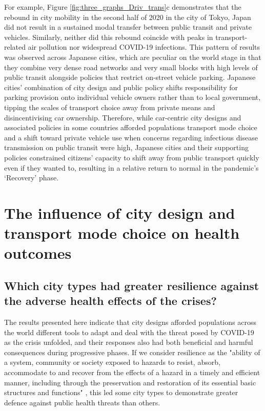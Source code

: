 \documentclass[preprint,10pt]{elsarticle} %
\begin{document}
For example, Figure \ref{fig:three_graphs_Driv_trans}c demonstrates that the rebound in city mobility in the second half of 2020 in the city of Tokyo, Japan did not result in a sustained modal transfer between public transit and private vehicles. Similarly, neither did this rebound coincide with peaks in transport-related air pollution nor widespread COVID-19 infections. This pattern of results was observed across Japanese cities, which are peculiar on the world stage in that they combine very dense road networks and very small blocks with high levels of public transit alongside policies that restrict on-street vehicle parking\cite{clements2019socialising}. Japanese cities' combination of city design and public policy shifts responsibility for parking provision onto individual vehicle owners rather than to local government, tipping the scales of transport choice away from private means and disincentivising car ownership. Therefore, while car-centric city designs and associated policies in some countries afforded populations transport mode choice and a shift toward private vehicle use when concerns regarding infectious disease transmission on public transit were high, Japanese cities and their supporting policies constrained citizens' capacity to shift away from public transport quickly even if they wanted to, resulting in a relative return to normal in the pandemic's `Recovery' phase.


\section*{\textcolor{OliveGreen}{The influence of city design and transport mode choice on health outcomes}}
\subsection*{Which city types had greater resilience against the adverse health effects of the crises?}

The results presented here indicate that city designs afforded populations across the world different tools to adapt and deal with the threat posed by COVID-19 as the crisis unfolded, and their responses also had both beneficial and harmful consequences during progressive phases. If we consider resilience as the "ability of a system, community or society exposed to hazards to resist, absorb, accommodate to and recover from the effects of a hazard in a timely and efficient manner, including through the preservation and restoration of its essential basic structures and functions" \cite{unisdr2009terminology}, this led some city types to demonstrate greater defence against public health threats than others.
\end{document}
